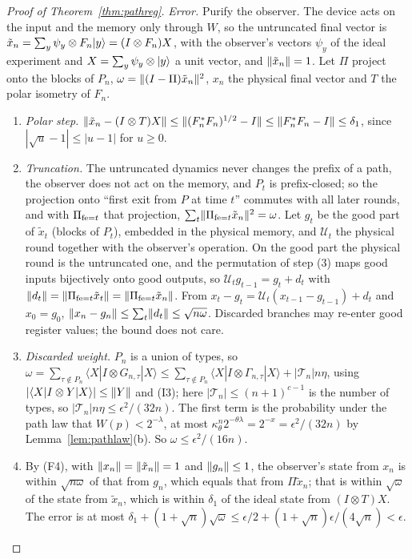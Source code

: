 \begin{proof}[Proof of Theorem~\ref{thm:pathreg}]
\emph{Error.} Purify the observer. The device acts on the input and the memory only through $W$, so the untruncated final vector is
$\tilde x_n=\sum_y\psi_y\otimes F_n\lvert y\rangle=(I\otimes F_n)X$, with the observer's vectors $\psi_y$ of the ideal experiment and $X=\sum_y\psi_y\otimes\lvert y\rangle$ a unit vector, and
$\lVert \tilde x_n\rVert=1$. Let $\Pi$ project onto the blocks of $P_n$, $\omega=\lVert (I-\Pi)\tilde x_n\rVert^2$, $x_n$ the physical final vector and $T$ the polar isometry of $F_n$.
\begin{enumerate}[label=\arabic*.,itemsep=1pt]
\item \emph{Polar step.} $\lVert \tilde x_n-(I\otimes T)X\rVert\le\lVert (F_n^*F_n)^{1/2}-I\rVert\le\lVert F_n^*F_n-I\rVert\le\delta_1$, since $|\sqrt u-1|\le|u-1|$ for $u\ge0$.
\item \emph{Truncation.} The untruncated dynamics never changes the prefix of a path, the observer does not act on the memory, and $P_t$ is prefix-closed; so
the projection onto ``first exit from $P$ at time $t$'' commutes with all later rounds, and with $\Pi_{{\rm fe}=t}$ that projection,
$\sum_t\lVert \Pi_{{\rm fe}=t}\tilde x_n\rVert^2=\omega$. Let $g_t$ be the good part of $\tilde x_t$ (blocks of $P_t$), embedded in the physical memory, and $\mathcal U_t$ the
physical round together with the observer's operation. On the good part the physical round is the untruncated one, and the permutation of step (3) maps good
inputs bijectively onto good outputs, so $\mathcal U_tg_{t-1}=g_t+d_t$ with $\lVert d_t\rVert=\lVert \Pi_{{\rm fe}=t}\tilde x_t\rVert=\lVert \Pi_{{\rm fe}=t}\tilde x_n\rVert$. From
$x_t-g_t=\mathcal U_t(x_{t-1}-g_{t-1})+d_t$ and $x_0=g_0$, $\lVert x_n-g_n\rVert\le\sum_t\lVert d_t\rVert\le\sqrt{n\omega}$. Discarded branches may re-enter good register values;
the bound does not care.
\item \emph{Discarded weight.} $P_n$ is a union of types, so $\omega=\sum_{\tau\notin P_n}\langle X|I\otimes G_{n,\tau}|X\rangle\le\sum_{\tau\notin P_n}\langle X|I\otimes\Gamma_{n,\tau}|X\rangle+|\mathcal T_n|n\eta$,
using $|\langle X|I\otimes Y|X\rangle|\le\lVert Y\rVert$ and (I3); here $|\mathcal T_n|\le(n+1)^{c-1}$ is the number of types, so $|\mathcal T_n|n\eta\le\epsilon^2/(32n)$. The first
term is the probability under the path law that $W(p)<2^{-\lambda}$, at most $\kappa_\theta^n2^{-\theta\lambda}=2^{-x}=\epsilon^2/(32n)$ by Lemma~\ref{lem:pathlaw}(b). So
$\omega\le\epsilon^2/(16n)$.
\item By (F4), with $\lVert x_n\rVert=\lVert \tilde x_n\rVert=1$ and $\lVert g_n\rVert\le1$, the observer's state from $x_n$ is within $\sqrt{n\omega}$ of that from $g_n$, which equals that from
$\Pi\tilde x_n$; that is within $\sqrt\omega$ of the state from $\tilde x_n$, which is within $\delta_1$ of the ideal state from $(I\otimes T)X$. The error is at most
$\delta_1+(1+\sqrt n)\sqrt\omega\le\epsilon/2+(1+\sqrt n)\epsilon/(4\sqrt n)<\epsilon$.
\end{enumerate}


\end{proof}
